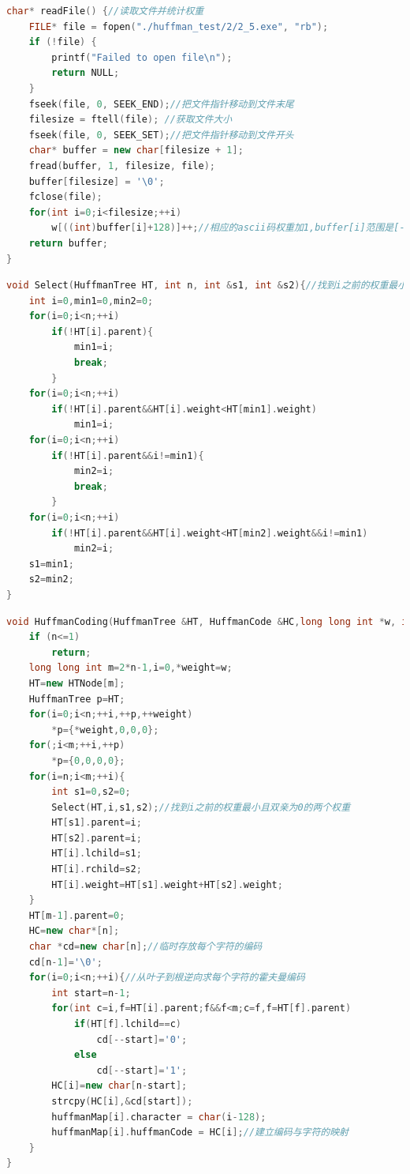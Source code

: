 \documentclass{ctexart}
\begin{document}
\begin{lstlisting}[language=C++, caption=读取文件并统计权重]
	char* readFile() {//读取文件并统计权重
    FILE* file = fopen("./huffman_test/2/2_5.exe", "rb");
    if (!file) {
        printf("Failed to open file\n");
        return NULL;
    }
	fseek(file, 0, SEEK_END);//把文件指针移动到文件末尾
    filesize = ftell(file); //获取文件大小
    fseek(file, 0, SEEK_SET);//把文件指针移动到文件开头
    char* buffer = new char[filesize + 1];
    fread(buffer, 1, filesize, file);
    buffer[filesize] = '\0';
    fclose(file);
    for(int i=0;i<filesize;++i)
        w[((int)buffer[i]+128)]++;//相应的ascii码权重加1,buffer[i]范围是[-128,127],故需加一个偏移量
    return buffer;
}
\end{lstlisting}
\begin{lstlisting}[language=C++, caption=找到i之前的权重最小且双亲为0的两个叶子节点]
	void Select(HuffmanTree HT, int n, int &s1, int &s2){//找到i之前的权重最小且双亲为0的两个叶子节点
    int i=0,min1=0,min2=0;
    for(i=0;i<n;++i)
        if(!HT[i].parent){
            min1=i;
            break;
        }
    for(i=0;i<n;++i)
        if(!HT[i].parent&&HT[i].weight<HT[min1].weight)
            min1=i;
    for(i=0;i<n;++i)
        if(!HT[i].parent&&i!=min1){
            min2=i;
            break;
        }
    for(i=0;i<n;++i)
        if(!HT[i].parent&&HT[i].weight<HT[min2].weight&&i!=min1)
            min2=i;
    s1=min1;
    s2=min2;
}
\end{lstlisting}
\begin{lstlisting}[language=C++, caption=建立霍夫曼树]
	void HuffmanCoding(HuffmanTree &HT, HuffmanCode &HC,long long int *w, int n){//建立霍夫曼树
    if (n<=1)
        return;
    long long int m=2*n-1,i=0,*weight=w;
    HT=new HTNode[m];
    HuffmanTree p=HT;
    for(i=0;i<n;++i,++p,++weight)
        *p={*weight,0,0,0};
    for(;i<m;++i,++p)
        *p={0,0,0,0};
    for(i=n;i<m;++i){
        int s1=0,s2=0;
        Select(HT,i,s1,s2);//找到i之前的权重最小且双亲为0的两个权重
        HT[s1].parent=i;
        HT[s2].parent=i;
        HT[i].lchild=s1;
        HT[i].rchild=s2;
        HT[i].weight=HT[s1].weight+HT[s2].weight;
    }
    HT[m-1].parent=0;
    HC=new char*[n];
    char *cd=new char[n];//临时存放每个字符的编码
    cd[n-1]='\0';
    for(i=0;i<n;++i){//从叶子到根逆向求每个字符的霍夫曼编码
        int start=n-1;
        for(int c=i,f=HT[i].parent;f&&f<m;c=f,f=HT[f].parent)
            if(HT[f].lchild==c)
                cd[--start]='0';
            else
                cd[--start]='1';
        HC[i]=new char[n-start];
        strcpy(HC[i],&cd[start]);
        huffmanMap[i].character = char(i-128);
        huffmanMap[i].huffmanCode = HC[i];//建立编码与字符的映射
    }
}
\end{lstlisting}
\end{document}
